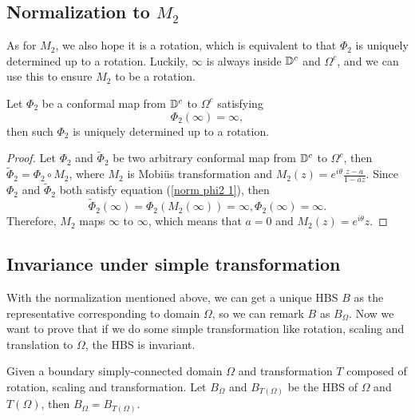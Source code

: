\documentclass[review,onefignum,onetabnum]{siamonline190516}
\begin{document}
    \subsection{Normalization to $M_2$}\label{norm2}
    As for $M_2$, we also hope it is a rotation, which is equivalent to that $\Phi_2$ is uniquely determined up to a rotation. Luckily, $\infty$ is always inside $\mathbb{D}^c$ and $\Omega^c$, and we can use this to ensure $M_2$ to be a rotation.

    \begin{theorem}
        Let $\Phi_2$ be a conformal map from $\mathbb{D}^c$ to $\Omega^c$ satisfying
        \begin{equation}
            \Phi_2(\infty) = \infty, \label{norm phi2 1}
        \end{equation}
        then such $\Phi_2$ is uniquely determined up to a rotation.
    \end{theorem}

    \begin{proof}
        Let $\Phi_2$ and $\tilde{\Phi}_2$ be two arbitrary conformal map from $\mathbb{D}^c$ to $\Omega^c$, then $\tilde{\Phi}_2 = \Phi_2 \circ M_2$, where $M_2$ is Mobi\"us transformation and $M_2(z) = e^{i \theta} \frac{z - a}{1- \overline{a}z}$. Since $\Phi_2$ and $\tilde{\Phi}_2$ both satisfy equation (\ref{norm phi2 1}), then
        \begin{equation*}
            \tilde{\Phi}_2(\infty) = \Phi_2(M_2(\infty)) = \infty, \Phi_2(\infty) = \infty.
        \end{equation*}
        Therefore, $M_2$ maps $\infty$ to $\infty$, which means that $a = 0$ and $M_2(z) = e^{i \theta} z$.
    \end{proof}

\subsection{Invariance under simple transformation}
    With the normalization mentioned above, we can get a unique HBS $B$ as the representative corresponding to domain $\Omega$, so we can remark $B$ as $B_\Omega$. Now we want to prove that if we do some simple transformation like rotation, scaling and translation to $\Omega$, the HBS is invariant.

    \begin{theorem}\label{invariance theorem}
        Given a boundary simply-connected domain $\Omega$ and transformation $T$ composed of rotation, scaling and transformation. Let $B_\Omega$ and $B_{T(\Omega)}$ be the HBS of $\Omega$ and $T(\Omega)$, then $B_\Omega = B_{T(\Omega)}$.
    \end{theorem}
\end{document}
